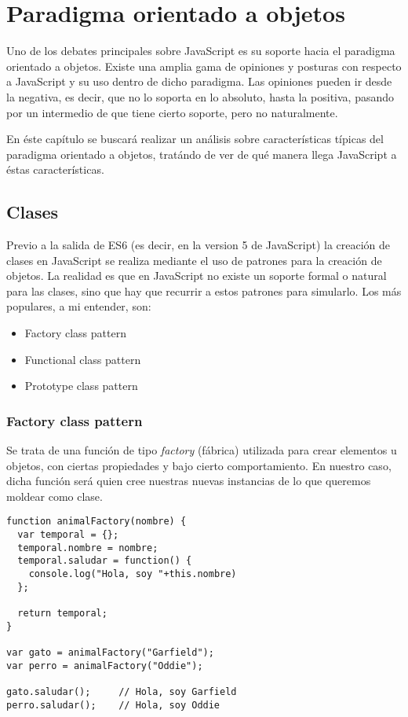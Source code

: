 \chapter{Paradigma orientado a objetos}

\label{Chapter4}


Uno de los debates principales sobre JavaScript es su soporte hacia el paradigma orientado a objetos. Existe una amplia gama de opiniones y posturas con respecto a JavaScript y su uso dentro de dicho paradigma. Las opiniones pueden ir desde la negativa, es decir, que no lo soporta en lo absoluto, hasta la positiva, pasando por un intermedio de que tiene cierto soporte, pero no naturalmente.

En éste capítulo se buscará realizar un análisis sobre características típicas del paradigma orientado a objetos, tratándo de ver de qué manera llega JavaScript a éstas características.


\section{Clases}

Previo a la salida de ES6 (es decir, en la version 5 de JavaScript) la creación de clases en JavaScript se realiza mediante el uso de patrones para la creación de objetos. La realidad es que en JavaScript no existe un soporte formal o natural para las clases, sino que hay que recurrir a estos patrones para simularlo. Los más populares, a mi entender, son:

\begin{itemize}
	\item Factory class pattern
	\item Functional class pattern
	\item Prototype class pattern
\end{itemize}

\subsection{Factory class pattern}

Se trata de una función de tipo \textit{factory} (fábrica) utilizada para crear elementos u objetos, con ciertas propiedades y bajo cierto comportamiento. En nuestro caso, dicha función será quien cree nuestras nuevas instancias de lo que queremos moldear como clase.

\begin{lstlisting}[title={Factory class pattern}]
function animalFactory(nombre) {
  var temporal = {};
  temporal.nombre = nombre;
  temporal.saludar = function() {
    console.log("Hola, soy "+this.nombre)
  };

  return temporal;
}

var gato = animalFactory("Garfield");
var perro = animalFactory("Oddie");

gato.saludar();		// Hola, soy Garfield
perro.saludar();	// Hola, soy Oddie
\end{lstlisting}

